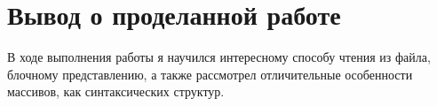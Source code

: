\documentclass[12pt,a4paper]{extarticle}
\begin{document}
\section{Вывод о проделанной работе}
В ходе выполнения работы я научился интересному способу чтения из файла, блочному представлению, а также рассмотрел
отличительные особенности массивов, как синтаксических структур.
\end{document}
